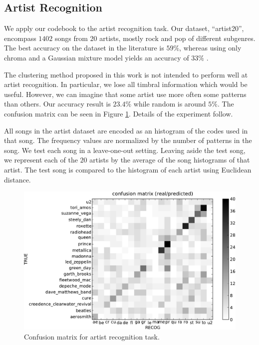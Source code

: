 \documentclass{article}
\begin{document}
\subsection{Artist Recognition} \label{ssec:artist}

We apply our codebook to the artist recognition task.
Our dataset, ``artist20'', encompass $1402$ songs from $20$ artists, 
mostly rock and pop of different subgenres.
The best accuracy on the dataset in the literature is $59\%$, whereas
using only chroma and a Gaussian mixture model yields an accuracy of
$33\%$ \cite{Ellis2007}.

The clustering method proposed in this work is not
intended to perform well at artist recognition. 
In particular,
we lose all timbral information which would be useful. 
However, we can
imagine that some artist use more often some patterns than others.
Our accuracy result is $23.4\%$ while random
is around $5\%$. 
The confusion matrix can be seen in Figure \ref{fig:conf_mat}.
Details of the experiment follow.

All songs in the artist dataset are encoded as an histogram of the codes
used in that song. The frequency values are normalized by the number
of patterns in the song. We test each song in a leave-one-out setting.
Leaving aside the test song, we represent each of the $20$ artists by the 
average of
the song histograms of that artist. The test song is compared to
the histogram of each artist using Euclidean distance.


\begin{figure}[t]
\includegraphics[width=.9\columnwidth]{conf_mat_per_artist}
\caption{\small{Confusion matrix for artist recognition task.}}
\label{fig:conf_mat}
\end{figure}
\end{document}
